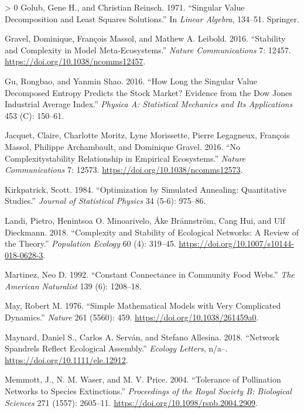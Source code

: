 \documentclass[11pt]{article}
\newlength{\cslhangindent}
\newenvironment{CSLReferences}[3] %
 {%
  \setlength{\parindent}{0pt}
  \ifodd #1 \everypar{\setlength{\hangindent}{\cslhangindent}}\ignorespaces\fi
  \ifnum #2 > 0
  \setlength{\parskip}{#2\baselineskip}
  \fi
 }%
 {}
\begin{document}
\begin{CSLReferences}{1}{0}
\leavevmode\hypertarget{ref-Golub1971SinVal}{}%
Golub, Gene H., and Christian Reinsch. 1971. {``Singular Value
Decomposition and Least Squares Solutions.''} In \emph{Linear Algebra},
134--51. Springer.

\leavevmode\hypertarget{ref-Gravel2016StaCom}{}%
Gravel, Dominique, François Massol, and Mathew A. Leibold. 2016.
{``Stability and Complexity in Model Meta-Ecosystems.''} \emph{Nature
Communications} 7: 12457. \url{https://doi.org/10.1038/ncomms12457}.

\leavevmode\hypertarget{ref-Gu2016HowLon}{}%
Gu, Rongbao, and Yanmin Shao. 2016. {``How Long the Singular Value
Decomposed Entropy Predicts the Stock Market? Evidence from the Dow
Jones Industrial Average Index.''} \emph{Physica A: Statistical
Mechanics and Its Applications} 453 (C): 150--61.

\leavevmode\hypertarget{ref-Jacquet2016NoCom}{}%
Jacquet, Claire, Charlotte Moritz, Lyne Morissette, Pierre Legagneux,
François Massol, Philippe Archambault, and Dominique Gravel. 2016. {``No
Complexitystability Relationship in Empirical Ecosystems.''}
\emph{Nature Communications} 7: 12573.
\url{https://doi.org/10.1038/ncomms12573}.

\leavevmode\hypertarget{ref-Kirkpatrick1984OptSim}{}%
Kirkpatrick, Scott. 1984. {``Optimization by Simulated Annealing:
Quantitative Studies.''} \emph{Journal of Statistical Physics} 34 (5-6):
975--86.

\leavevmode\hypertarget{ref-Landi2018ComSta}{}%
Landi, Pietro, Henintsoa O. Minoarivelo, Åke Brännström, Cang Hui, and
Ulf Dieckmann. 2018. {``Complexity and Stability of Ecological Networks:
A Review of the Theory.''} \emph{Population Ecology} 60 (4): 319--45.
\url{https://doi.org/10.1007/s10144-018-0628-3}.

\leavevmode\hypertarget{ref-Martinez1992ConCon}{}%
Martinez, Neo D. 1992. {``Constant Connectance in Community Food
Webs.''} \emph{The American Naturalist} 139 (6): 1208--18.

\leavevmode\hypertarget{ref-May1976SimMat}{}%
May, Robert M. 1976. {``Simple Mathematical Models with Very Complicated
Dynamics.''} \emph{Nature} 261 (5560): 459.
\url{https://doi.org/10.1038/261459a0}.

\leavevmode\hypertarget{ref-Maynard2018NetSpa}{}%
Maynard, Daniel S., Carlos A. Serván, and Stefano Allesina. 2018.
{``Network Spandrels Reflect Ecological Assembly.''} \emph{Ecology
Letters}, n/a--. \url{https://doi.org/10.1111/ele.12912}.

\leavevmode\hypertarget{ref-Memmott2004TolPol}{}%
Memmott, J., N. M. Waser, and M. V. Price. 2004. {``Tolerance of
Pollination Networks to Species Extinctions.''} \emph{Proceedings of the
Royal Society B: Biological Sciences} 271 (1557): 2605--11.
\url{https://doi.org/10.1098/rspb.2004.2909}.


\end{CSLReferences}
\end{document}
